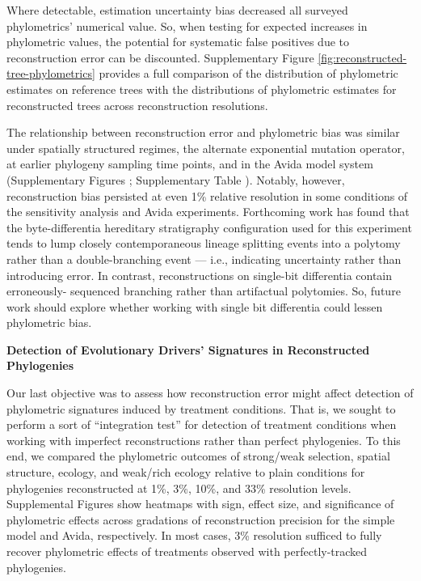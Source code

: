 Where detectable, estimation uncertainty bias decreased all surveyed phylometrics' numerical value.
So, when testing for expected increases in phylometric values, the potential for systematic false positives due to reconstruction error can be discounted.
Supplementary Figure \ref{fig:reconstructed-tree-phylometrics} provides a full comparison of the distribution of phylometric estimates on reference trees with the distributions of phylometric estimates for reconstructed trees across reconstruction resolutions.

The relationship between reconstruction error and phylometric bias was similar under spatially structured regimes, the alternate exponential mutation operator, at earlier phylogeny sampling time points, and in the Avida model system (Supplementary Figures ; Supplementary Table ).
Notably, however, reconstruction bias persisted at even 1\% relative resolution in some conditions of the sensitivity analysis and Avida experiments.
Forthcoming work has found that the byte-differentia hereditary stratigraphy configuration used for this experiment tends to lump closely contemporaneous lineage splitting events into a polytomy rather than a double-branching event --- i.e., indicating uncertainty rather than introducing error.
In contrast, reconstructions on single-bit differentia contain erroneously- sequenced branching rather than artifactual polytomies.
So, future work should explore whether working with single bit differentia could lessen phylometric bias.

\textbf{Detection of Evolutionary Drivers' Signatures in Reconstructed Phylogenies}

Our last objective was to assess how reconstruction error might affect detection of phylometric signatures induced by treatment conditions.
That is, we sought to perform a sort of ``integration test'' for detection of treatment conditions when working with imperfect reconstructions rather than perfect phylogenies.
To this end, we compared the phylometric outcomes of strong/weak selection, spatial structure, ecology, and weak/rich ecology relative to plain conditions for phylogenies reconstructed at 1\%, 3\%, 10\%, and 33\% resolution levels.
Supplemental Figures  show heatmaps with sign, effect size, and significance of phylometric effects across gradations of reconstruction precision for the simple model and Avida, respectively.
In most cases, 3\% resolution sufficed to fully recover phylometric effects of treatments observed with perfectly-tracked phylogenies.
